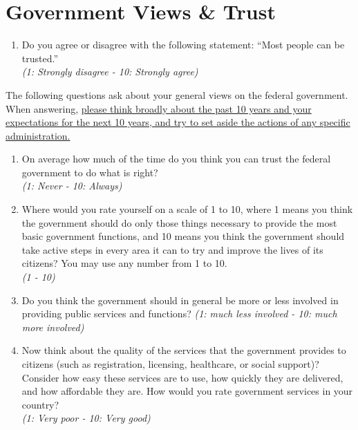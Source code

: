 \documentclass[11pt]{article}
\begin{document}
\section*{Government Views \& Trust}
\begin{enumerate}[resume]
    \item Do you agree or disagree with the following statement: “Most people can be trusted.” \\
    \textit{(1: Strongly disagree - 10: Strongly agree)}
\end{enumerate}
The following questions ask about your general views on the federal government. When answering, \uline{please think broadly about the past 10 years and your expectations for the next 10 years, and try to set aside the actions of any specific administration.}
\begin{enumerate}[resume]
    \item On average how much of the time do you think you can trust the federal government to do what is right? \\ \textit{(1: Never - 10: Always)} 
    \item Where would you rate yourself on a scale of 1 to 10, where 1 means you think the government should do only those things necessary to provide the most basic government functions, and 10 means you think the government should take active steps in every area it can to try and improve the lives of its citizens? You may use any number from 1 to 10. \\\textit{(1 - 10)}
    \item Do you think the government should in general be more or less involved in providing public services and functions?
    \textit{(1: much less involved - 10: much more involved)}
    \item Now think about the quality of the services that the government provides to citizens (such as registration, licensing, healthcare, or social support)? Consider how easy these services are to use, how quickly they are delivered, and how affordable they are. How would you rate government services in your country? \\
    \textit{(1: Very poor - 10: Very good)}
\end{enumerate}
\end{document}

